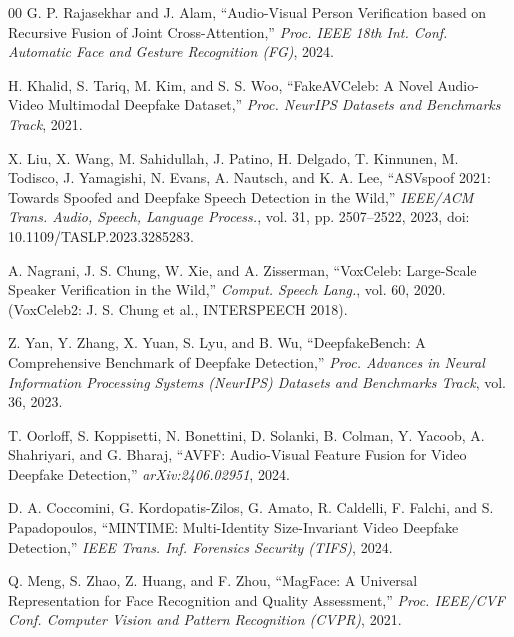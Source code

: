 \documentclass[conference]{IEEEtran}
\begin{document}
\begin{thebibliography}{00}
G. P. Rajasekhar and J. Alam, ``Audio-Visual Person Verification based on Recursive Fusion of Joint Cross-Attention,'' \textit{Proc. IEEE 18th Int. Conf. Automatic Face and Gesture Recognition (FG)}, 2024.

H. Khalid, S. Tariq, M. Kim, and S. S. Woo, ``FakeAVCeleb: A Novel Audio-Video Multimodal Deepfake Dataset,'' \textit{Proc. NeurIPS Datasets and Benchmarks Track}, 2021.

X. Liu, X. Wang, M. Sahidullah, J. Patino, H. Delgado, T. Kinnunen, M. Todisco, J. Yamagishi, N. Evans, A. Nautsch, and K. A. Lee, ``ASVspoof 2021: Towards Spoofed and Deepfake Speech Detection in the Wild,'' \textit{IEEE/ACM Trans. Audio, Speech, Language Process.}, vol. 31, pp. 2507–2522, 2023, doi: 10.1109/TASLP.2023.3285283.

A. Nagrani, J. S. Chung, W. Xie, and A. Zisserman, ``VoxCeleb: Large-Scale Speaker Verification in the Wild,'' \textit{Comput. Speech Lang.}, vol. 60, 2020. (VoxCeleb2: J. S. Chung et al., INTERSPEECH 2018).

Z. Yan, Y. Zhang, X. Yuan, S. Lyu, and B. Wu, ``DeepfakeBench: A Comprehensive Benchmark of Deepfake Detection,'' \textit{Proc. Advances in Neural Information Processing Systems (NeurIPS) Datasets and Benchmarks Track}, vol. 36, 2023.

T. Oorloff, S. Koppisetti, N. Bonettini, D. Solanki, B. Colman, Y. Yacoob, A. Shahriyari, and G. Bharaj, ``AVFF: Audio-Visual Feature Fusion for Video Deepfake Detection,'' \textit{arXiv:2406.02951}, 2024.

D. A. Coccomini, G. Kordopatis-Zilos, G. Amato, R. Caldelli, F. Falchi, and S. Papadopoulos, ``MINTIME: Multi-Identity Size-Invariant Video Deepfake Detection,'' \textit{IEEE Trans. Inf. Forensics Security (TIFS)}, 2024.

Q. Meng, S. Zhao, Z. Huang, and F. Zhou, ``MagFace: A Universal Representation for Face Recognition and Quality Assessment,'' \textit{Proc. IEEE/CVF Conf. Computer Vision and Pattern Recognition (CVPR)}, 2021.
\end{thebibliography}
\end{document}
